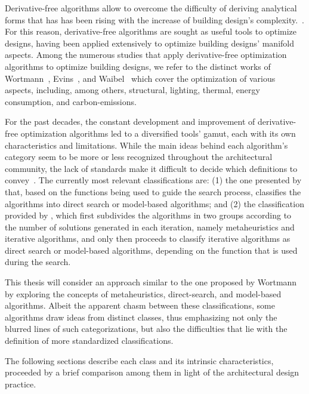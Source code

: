 	Derivative-free algorithms allow to overcome the difficulty of deriving analytical forms that has has been rising with the increase of building design's complexity.~\cite{Machairas2014}. For this reason, derivative-free algorithms are sought as useful tools to optimize designs, having been applied extensively to optimize building designs' manifold aspects. Among the numerous studies that apply derivative-free optimization algorithms to optimize building designs, we refer to the distinct works of Wortmann~\cite{Wortmann2016BBO,Wortmann2015AdvSBO,Wortmann2017GABESTCHOICE,Wortmann2017Opossum}, Evins~\cite{Evins2011,Evins2012MOO,Evins2013}, and Waibel~\cite{Waibel2018} which cover the optimization of various aspects, including, among others, structural, lighting, thermal, energy consumption, and carbon-emissions. 
	
	For the past decades, the constant development and improvement of derivative-free optimization algorithms led to a diversified tools' gamut, each with its own characteristics and limitations. While the main ideas behind each algorithm's category seem to be more or less recognized throughout the architectural community, the lack of standards make it difficult to decide which definitions to convey~\cite{Rios2013, Wortmann2017ADO}. The currently most relevant classifications are: (1) the one presented by \cite{Rios2013} that, based on the functions being used to guide the search process, classifies the algorithms into direct search or model-based algorithms; and (2) the classification provided by \cite{Wortmann2017ADO}, which first subdivides the algorithms in two groups according to the number of solutions generated in each iteration, namely metaheuristics and iterative algorithms, and only then proceeds to classify iterative algorithms as direct search or model-based algorithms, depending on the function that is used during the search. 
	
	This thesis will consider an approach similar to the one proposed by Wortmann~\cite{Wortmann2017ADO} by exploring the concepts of metaheuristics, direct-search, and model-based algorithms. Albeit the apparent chasm between these classifications, some algorithms draw ideas from distinct classes, thus emphasizing not only the blurred lines of such categorizations, but also the difficulties that lie with the definition of more standardized classifications. 
	
	The following sections describe each class and its intrinsic characteristics, proceeded by a brief comparison among them in light of the architectural design practice. 	
	
